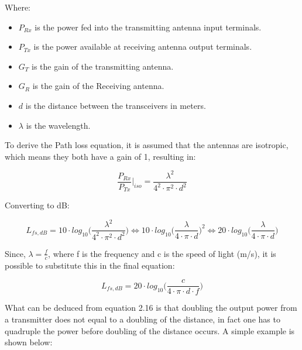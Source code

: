 Where:

\begin{itemize}
  \item $P_{Rx}$ is the power fed into the transmitting antenna input terminals.
  \item $P_{Tx}$ is the power available at receiving antenna output terminals.
  \item $G_T$ is the gain of the transmitting antenna.
  \item $G_R$ is the gain of the Receiving antenna.
  \item $d$ is the distance between the transceivers in meters.
  \item $\lambda$ is the wavelength.
\end{itemize}

To derive the Path loss equation, it is assumed that the antennas are isotropic, which means they both have a gain of 1, resulting in:

\begin{equation}
    \frac{P_{Rx}}{P_{Tx}}|_{iso} =  \frac{\lambda^2}{4^2 \cdot \pi^2 \cdot d^2}
\end{equation}



Converting to dB:

\begin{equation}
    L_{fs,dB} =  10 \cdot log_{10}\Big(\frac{\lambda^2}{4^2 \cdot \pi^2 \cdot d^2}\Big) \Leftrightarrow 10 \cdot log_{10}\Big(\frac{\lambda}{4 \cdot \pi \cdot d}\Big)^2 \Leftrightarrow 20 \cdot log_{10}\Big(\frac{\lambda}{4 \cdot \pi \cdot d}\Big) 
\end{equation}

Since, $\lambda = \frac{f}{c}$, where f is the frequency and c is the speed of light (m/s), it is possible to substitute this in the final equation:

\begin{equation}
    L_{fs,dB} = 20 \cdot log_{10}\Big(\frac{c}{4 \cdot \pi \cdot d \cdot f}\Big) 
\end{equation}

What can be deduced from equation 2.16 is that doubling the output power from a transmitter does not equal to a doubling of the distance, in fact one has to quadruple the power before doubling of the distance occurs. A simple example is shown below:

